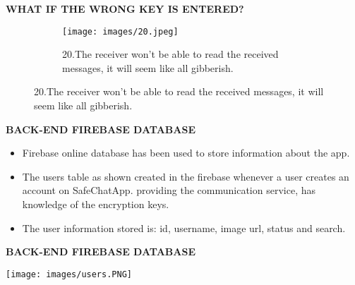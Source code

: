 \documentclass{beamer}
\begin{document}
\begin{frame}
\begin{tcolorbox}
\begin{center}
\textsc{\textbf{\textcolor{byzantium}{WHAT IF THE WRONG KEY IS ENTERED?}}}
\end{center}
\end{tcolorbox}
\begin{figure}
\centering
\begin{subfigure}{\textwidth}
  \centering
  \texttt{[image: images/20.jpeg]}
  \caption{20.The receiver won’t be able to read the received messages, it will seem like all gibberish.}
  \label{fig:sub1}
\end{subfigure}
\end{figure}
\end{frame}





\begin{frame}
\begin{tcolorbox}
\begin{center}
\textsc{\textbf{\textcolor{byzantium}{BACK-END FIREBASE DATABASE}}}
\end{center}
\end{tcolorbox}
\begin{flushleft}
\begin{itemize}
\item Firebase online database has been used to store information about the app.
\item The users table as shown created in the firebase whenever a user creates an account on SafeChatApp. providing the communication service, has knowledge of the encryption keys.
\item The user information stored is: id, username, image url, status and search.
\end{itemize}
\end{flushleft}
\end{frame}

\begin{frame}
\begin{tcolorbox}
\begin{center}
\textsc{\textbf{\textcolor{byzantium}{BACK-END FIREBASE DATABASE}}}
\end{center}
\end{tcolorbox}
\begin{center}
\texttt{[image: images/users.PNG]}
\end{center}
\end{frame}
\end{document}
